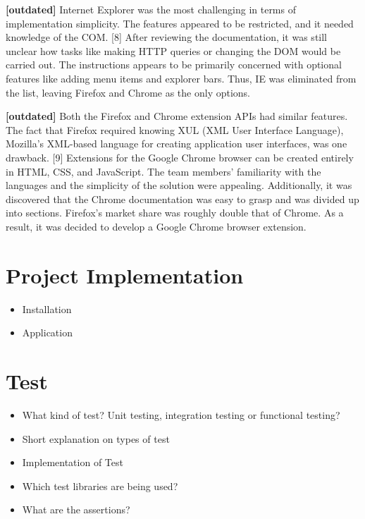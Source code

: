 \textbf{[outdated]} Internet Explorer was the most challenging in terms of implementation simplicity. The features appeared to be restricted, and it needed knowledge of the COM. [8] After reviewing the documentation, it was still unclear how tasks like making HTTP queries or changing the DOM would be carried out. The instructions appears to be primarily concerned with optional features like adding menu items and explorer bars. Thus, IE was eliminated from the list, leaving Firefox and Chrome as the only options.

\textbf{[outdated]} Both the Firefox and Chrome extension APIs had similar features. The fact that Firefox required knowing XUL (XML User Interface Language), Mozilla's XML-based language for creating application user interfaces, was one drawback. [9] Extensions for the Google Chrome browser can be created entirely in HTML, CSS, and JavaScript. The team members' familiarity with the languages and the simplicity of the solution were appealing. Additionally, it was discovered that the Chrome documentation was easy to grasp and was divided up into sections. Firefox's market share was roughly double that of Chrome. As a result, it was decided to develop a Google Chrome browser extension.


\section{Project Implementation}
\begin{itemize}
  \item Installation
  \item Application
\end{itemize}

\section{Test}
\begin{itemize}
  \item What kind of test? Unit testing, integration testing or functional testing?
  \item Short explanation on types of test
  \item Implementation of Test
  \item Which test libraries are being used?
  \item What are the assertions?
\end{itemize}
